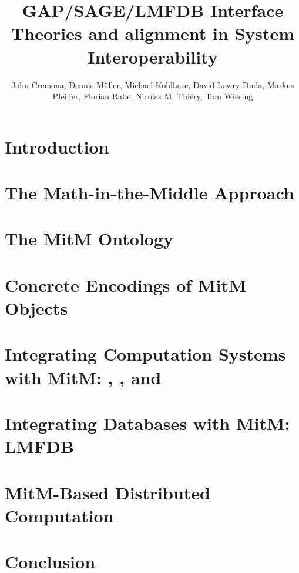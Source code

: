 \documentclass[book]{deliverablereport}
\title{GAP/SAGE/LMFDB Interface Theories and alignment in \ommtfor System Interoperability}
\author{John Cremona, Dennis M\"uller, Michael Kohlhase, David Lowry-Duda, Markus
  Pfeiffer, Florian Rabe, Nicolas M. Thiéry, Tom Wiesing}
\begin{document}
\begin{abstract}\end{abstract}
\maketitle
\setcounter{tocdepth}{2}
\newpage\tableofcontents\newpage

\section{Introduction}\label{sec:intro}
\newpage

\section[Math-in-the-Middle]{The Math-in-the-Middle Approach}\label{sec:mitm}
\newpage

\section[MitM Ontology]{The MitM Ontology}\label{sec:cgt}
\newpage

\section{Concrete Encodings of MitM Objects}\label{sec:codecs}
\newpage

\section[Computation Systems]{Integrating Computation Systems with MitM: \GAP, \Sage, and \Singular}\label{sec:apit}
\newpage

\section[Databases]{Integrating Databases with MitM: LMFDB}\label{sec:databases}
\newpage
\section[Distributed Computation]{MitM-Based Distributed Computation}\label{sec:case}
\newpage

\section{Conclusion}\label{sec:concl}


\printbibliography
\end{document}
